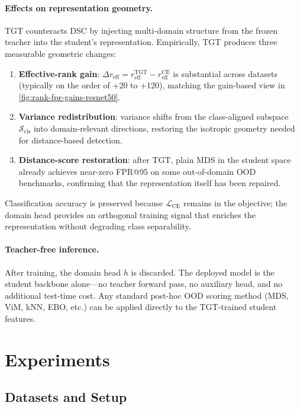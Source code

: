 \documentclass[runningheads]{llncs}
\begin{document}
\paragraph{Effects on representation geometry.}
TGT counteracts DSC by injecting multi-domain structure from the frozen teacher into the student's representation.
Empirically, TGT produces three measurable geometric changes:
\begin{enumerate}
  \item \textbf{Effective-rank gain}: $\Delta r_{\mathrm{eff}} = r_{\mathrm{eff}}^{\mathrm{TGT}} - r_{\mathrm{eff}}^{\mathrm{CE}}$ is substantial across datasets (typically on the order of +20 to +120), matching the gain-based view in \cref{fig:rank-fpr-gains-resnet50}.
  \item \textbf{Variance redistribution}: variance shifts from the class-aligned subspace $\mathcal{S}_{\mathrm{cls}}$ into domain-relevant directions, restoring the isotropic geometry needed for distance-based detection.
  \item \textbf{Distance-score restoration}: after TGT, plain MDS in the student space already achieves near-zero FPR@95 on some out-of-domain OOD benchmarks, confirming that the representation itself has been repaired.
\end{enumerate}
Classification accuracy is preserved because $\mathcal{L}_{\mathrm{CE}}$ remains in the objective; the domain head provides an orthogonal training signal that enriches the representation without degrading class separability.

\paragraph{Teacher-free inference.}
After training, the domain head $h$ is discarded.
The deployed model is the student backbone alone---no teacher forward pass, no auxiliary head, and no additional test-time cost.
Any standard post-hoc OOD scoring method (MDS, ViM, kNN, EBO, etc.) can be applied directly to the TGT-trained student features.


\section{Experiments}
\label{sec:experiments}

\subsection{Datasets and Setup}
\label{sec:exp:datasets}
\end{document}

